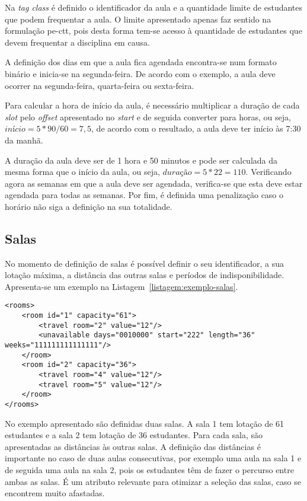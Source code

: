 Na \textit{tag class} é definido o identificador da aula e a quantidade limite de estudantes que podem frequentar a aula. O limite apresentado apenas faz sentido na formulação \gls{pe-ctt}, pois desta forma tem-se acesso à quantidade de estudantes que devem frequentar a disciplina em causa.

A definição dos dias em que a aula fica agendada encontra-se num formato binário e inicia-se na segunda-feira. De acordo com o exemplo, a aula deve ocorrer na segunda-feira, quarta-feira ou sexta-feira.

Para calcular a hora de início da aula, é necessário multiplicar a duração de cada \textit{slot} pelo \textit{offset} apresentado no \textit{start} e de seguida converter para horas, ou seja, $início = 5*90/60 = 7,5$, de acordo com o resultado, a aula deve ter início às 7:30 da manhã.

A duração da aula deve ser de 1 hora e 50 minutos e pode ser calculada da mesma forma que o início da aula, ou seja, $duração = 5*22 = 110$. Verificando agora as semanas em que a aula deve ser agendada, verifica-se que esta deve estar agendada para todas as semanas. Por fim, é definida uma penalização caso o horário não siga a definição na sua totalidade.

\subsection{Salas}

No momento de definição de salas é possível definir o seu identificador, a sua lotação máxima, a distância das outras salas e períodos de indisponibilidade. Apresenta-se um exemplo na Listagem~\ref{listagem:exemplo-salas}.

\begin{minipage}[c]{\linewidth}
\begin{lstlisting}[caption={Exemplo da definição das salas.}, label={listagem:exemplo-salas}]
<rooms>
    <room id="1" capacity="61">
        <travel room="2" value="12"/>
        <unavailable days="0010000" start="222" length="36" weeks="111111111111111"/>
    </room>
    <room id="2" capacity="36">
        <travel room="4" value="12"/>
        <travel room="5" value="12"/>
    </room>
</rooms>
\end{lstlisting}
\end{minipage}

No exemplo apresentado são definidas duas salas. A sala 1 tem lotação de 61 estudantes e a sala 2 tem lotação de 36 estudantes. Para cada sala, são apresentadas as distâncias às outras salas. A definição das distâncias é importante no caso de duas aulas consecutivas, por exemplo uma aula na sala 1 e de seguida uma aula na sala 2, pois os estudantes têm de fazer o percurso entre ambas as salas. É um atributo relevante para otimizar a seleção das salas, caso se encontrem muito afastadas.

